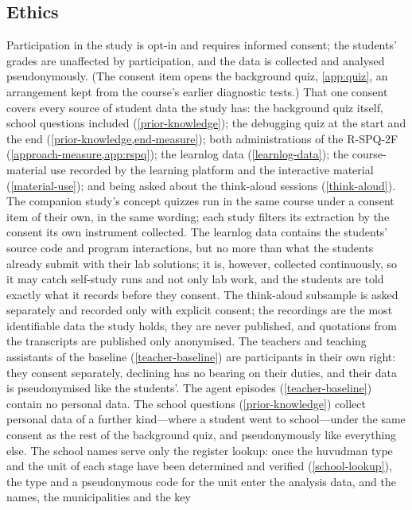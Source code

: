 \subsection{Ethics}
\label{ethics}

Participation in the study is opt-in and requires informed consent; the
students' grades are unaffected by participation, and the data is collected
and analysed pseudonymously.
(The consent item opens the background quiz, \cref{app:quiz}, an
arrangement kept from the course's earlier diagnostic tests.)
That one consent covers every source of student data the study has: the
background quiz itself, school questions included
(\cref{prior-knowledge}); the debugging quiz at the start and the end
(\cref{prior-knowledge,end-measure}); both administrations of the
R-SPQ-2F (\cref{approach-measure,app:rspq}); the learnlog data
(\cref{learnlog-data}); the course-material use recorded by the learning
platform and the interactive material (\cref{material-use}); and being
asked about the think-aloud sessions (\cref{think-aloud}).
The companion study's concept quizzes run in the same course under a
consent item of their own, in the same wording; each study filters its
extraction by the consent its own instrument collected.
The learnlog data contains the students' source code and program
interactions, but no more than what the students already submit with their
lab solutions; it is, however, collected continuously, so it may catch
self-study runs and not only lab work, and the students are told exactly
what it records before they consent.
The think-aloud subsample is asked separately and recorded only with
explicit consent; the recordings are the most identifiable data the study
holds, they are never published, and quotations from the transcripts are
published only anonymised.
The teachers and teaching assistants of the baseline
(\cref{teacher-baseline}) are participants in their own right: they
consent separately, declining has no bearing on their duties, and their
data is pseudonymised like the students'.
The agent episodes (\cref{teacher-baseline}) contain no personal data.
The school questions (\cref{prior-knowledge}) collect personal data of a
further kind---where a student went to school---under the same consent as
the rest of the background quiz, and pseudonymously like everything else.
The school names serve only the register lookup: once the huvudman type
and the unit of each stage have been determined and verified
(\cref{school-lookup}), the type and a pseudonymous code for the unit
enter the analysis data, and the names, the municipalities and the key
